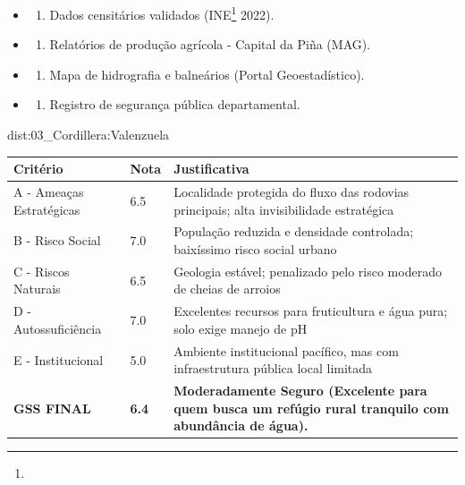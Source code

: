 {\begin{itemize}
\tightlist
\item
  \begin{enumerate}
  \def\labelenumi{\arabic{enumi})}
  \tightlist
  \item
    Dados censitários validados (INE\footnote{\fineINE} 2022).
  \end{enumerate}
\item
  \begin{enumerate}
  \def\labelenumi{\arabic{enumi})}
  \setcounter{enumi}{1}
  \tightlist
  \item
    Relatórios de produção agrícola - Capital da Piña (MAG).
  \end{enumerate}
\item
  \begin{enumerate}
  \def\labelenumi{\arabic{enumi})}
  \setcounter{enumi}{2}
  \tightlist
  \item
    Mapa de hidrografia e balneários (Portal Geoestadístico).
  \end{enumerate}
\item
  \begin{enumerate}
  \def\labelenumi{\arabic{enumi})}
  \setcounter{enumi}{3}
  \tightlist
  \item
    Registro de segurança pública departamental.
  \end{enumerate}
\end{itemize}}{dist:03_Cordillera:Valenzuela}
\begin{table}[ht!]
\small \begin{tabular}{p{3.0cm}p{0.8cm}p{6.0cm}} \toprule
\textbf{Critério} & \textbf{Nota} & \textbf{Justificativa} \\ \midrule
A - Ameaças Estratégicas & 6.5 & Localidade protegida do fluxo das rodovias principais; alta invisibilidade estratégica \\
B - Risco Social & 7.0 & População reduzida e densidade controlada; baixíssimo risco social urbano \\
C - Riscos Naturais & 6.5 & Geologia estável; penalizado pelo risco moderado de cheias de arroios \\
D - Autossuficiência & 7.0 & Excelentes recursos para fruticultura e água pura; solo exige manejo de pH \\
E - Institucional & 5.0 & Ambiente institucional pacífico, mas com infraestrutura pública local limitada \\
\midrule \textbf{GSS FINAL} & \textbf{6.4} & \textbf{Moderadamente Seguro (Excelente para quem busca um refúgio rural tranquilo com abundância de água).} \\ \bottomrule \end{tabular}
\end{table}
